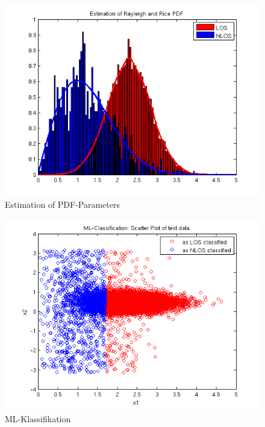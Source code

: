 \begin{figure}[ht!]
 \centering
 \includegraphics{./figures/5_1_1_estimation.png}
 \caption{Estimation of PDF-Parameters}
 \label{abb:estimation}
\end{figure}


\begin{figure}[ht!]
 \centering
 \includegraphics{./figures/5_1_1_ml.png}
 \caption{ML-Klassifikation}
 \label{abb:ml}
\end{figure}

